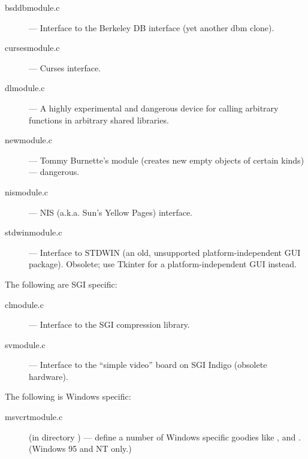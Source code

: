 \begin{description}
\item[bsddbmodule.c]
--- Interface to the Berkeley DB interface (yet another
dbm clone).

\item[cursesmodule.c]
--- Curses interface.

\item[dlmodule.c]
---  A highly experimental and dangerous device for calling
arbitrary \C{} functions in arbitrary shared libraries.

\item[newmodule.c]
--- Tommy Burnette's  module (creates new empty objects of
certain kinds) --- dangerous.

\item[nismodule.c]
--- NIS (a.k.a. Sun's Yellow Pages) interface.

\item[stdwinmodule.c]
--- Interface to STDWIN (an old, unsupported
platform-independent GUI package).  Obsolete; use Tkinter for a
platform-independent GUI instead.
\end{description}

The following are SGI specific:

\begin{description}
\item[clmodule.c]
--- Interface to the SGI compression library.

\item[svmodule.c]
--- Interface to the ``simple video'' board on SGI Indigo
(obsolete hardware).
\end{description}

The following is Windows specific:

\begin{description}
\item[msvcrtmodule.c]
(in directory ) --- define a number of Windows
specific goodies like ,  and
.  (Windows 95 and NT only.)
\end{description}
